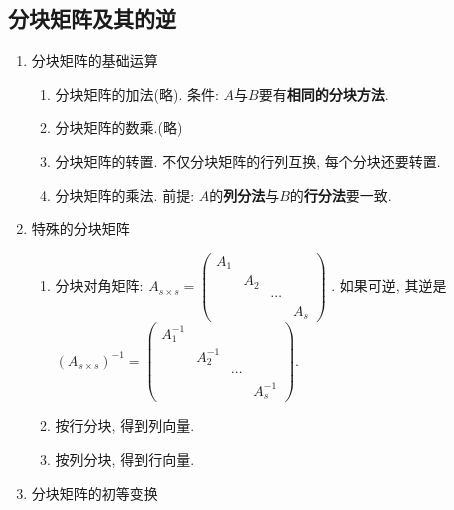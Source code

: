 \subsection*{分块矩阵及其的逆}
\begin{enumerate}
\item 分块矩阵的基础运算
\begin{enumerate}
\item 分块矩阵的加法(略). 条件: $A$与$B$要有\textbf{相同的分块方法}.
\item 分块矩阵的数乘.(略)
\item 分块矩阵的转置. 不仅分块矩阵的行列互换, 每个分块还要转置.
\item 分块矩阵的乘法. 前提: $A$的\textbf{列分法}与$B$的\textbf{行分法}要一致.
\end{enumerate}
\item 特殊的分块矩阵
\begin{enumerate}
\item 分块对角矩阵: $A_{s\times s}=\begin{pmatrix}A_{1}\\
 & A_{2}\\
 &  & \cdots\\
 &  &  & A_{s}
\end{pmatrix}$ . 如果可逆, 其逆是$(A_{s\times s})^{-1}=\begin{pmatrix}A_{1}^{-1}\\
 & A_{2}^{-1}\\
 &  & \cdots\\
 &  &  & A_{s}^{-1}
\end{pmatrix}$.
\item 按行分块, 得到列向量.
\item 按列分块, 得到行向量.
\end{enumerate}
\item 分块矩阵的初等变换
\end{enumerate}
